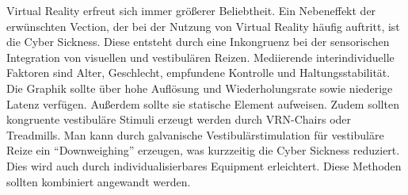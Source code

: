 Virtual Reality erfreut sich immer gr\"o{\ss}erer Beliebtheit. Ein  Nebeneffekt der erw\"unschten Vection, der bei der Nutzung von Virtual Reality h\"aufig auftritt, ist die Cyber Sickness.
Diese entsteht durch eine Inkongruenz bei der sensorischen Integration von visuellen und vestibul\"aren Reizen.
Mediierende interindividuelle Faktoren sind Alter, Geschlecht, empfundene Kontrolle und Haltungsstabilit\"at.
Die Graphik sollte \"uber hohe Aufl\"osung und Wiederholungsrate sowie niederige Latenz verf\"ugen. Au{\ss}erdem sollte sie statische Element aufweisen. Zudem sollten kongruente vestibul\"are Stimuli erzeugt werden durch VRN-Chairs oder Treadmills. Man kann durch galvanische Vestibul\"arstimulation f\"ur vestibul\"are Reize ein "`Downweighing"' erzeugen, was kurzzeitig die Cyber Sickness reduziert. Dies wird auch durch individualisierbares Equipment erleichtert. Diese Methoden sollten kombiniert angewandt werden.




